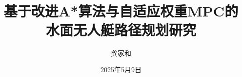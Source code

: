 \documentclass{beamer}
\title{基于改进A*算法与自适应权重MPC的\\水面无人艇路径规划研究}
\author{龚家和}
\institute{安徽大学·纽约石溪学院\\应用统计学\\本科毕业论文答辩}
\date{2025年5月9日}
\begin{document}
\begin{frame}[plain]
  \titlepage
\end{frame}









\end{document}
